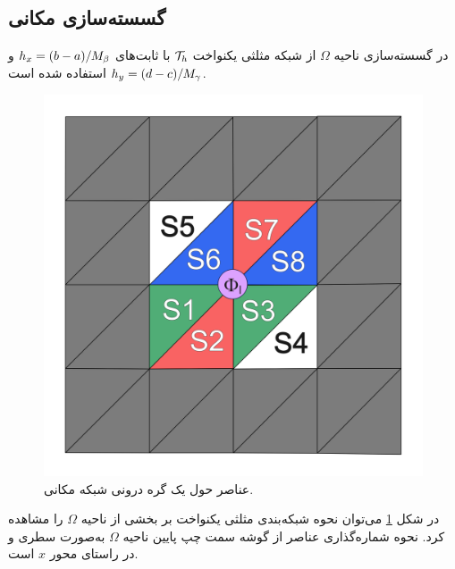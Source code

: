 \subsection{
گسسته‌سازی مکانی
}
در گسسته‌سازی ناحیه
$\Omega$
از شبکه مثلثی یکنواخت
$\mathcal{T}_{h}$
با ثابت‌های
$h_{x} = (b-a) / M_{\beta}$
و
$h_{y} = (d-c) / M_{\gamma}$
استفاده شده است.
\begin{figure}[h]
\centering
\includegraphics[scale=0.4]{./chapters/chapter2/figures/element.png}
\caption{
عناصر حول یک گره درونی شبکه مکانی.
}
\label{elementFig}
\end{figure}
در شکل
\ref{elementFig}
می‌توان نحوه شبکه‌بندی مثلثی یکنواخت بر بخشی از ناحیه
$\Omega$
را مشاهده کرد.
نحوه شماره‌گذاری عناصر از گوشه سمت چپ پایین ناحیه
$\Omega$
به‌صورت سطری و در راستای محور
$x$
است.

